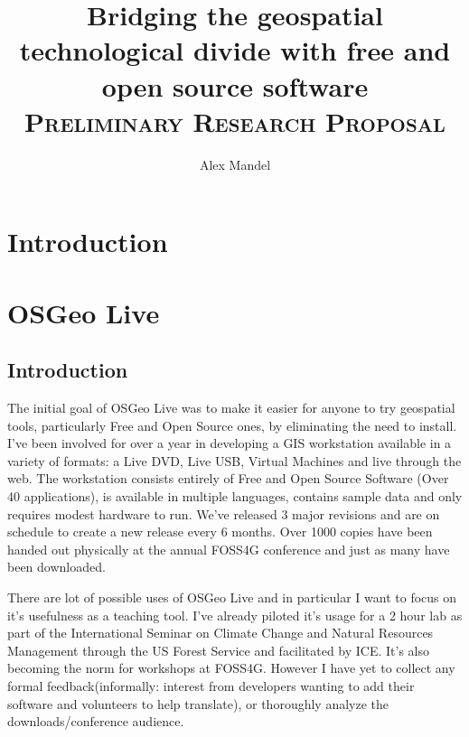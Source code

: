 \documentclass[12pt,letterpaper]{article}
\author{Alex Mandel}
\title{Bridging the geospatial technological divide with free and open source software
\\	
\textsc{\small Preliminary Research Proposal}\\[0.5cm]
}
\begin{document}
\maketitle

\section{Introduction}

\section{OSGeo Live}

\subsection{Introduction}
The initial goal of OSGeo Live was to make it easier for anyone to try geospatial tools, particularly Free and Open Source ones, by eliminating the need to install.
I've been involved for over a year in developing a GIS workstation available in a variety of formats:
a Live DVD, Live USB, Virtual Machines and live through the web. The workstation consists entirely of Free and Open Source Software (Over 40 applications), is available in multiple languages, contains sample data and only requires modest hardware to run. We've released 3 major revisions and are on schedule to create a new release every 6 months. Over 1000 copies have been handed out physically at the annual FOSS4G conference and just as many have been downloaded.

There are lot of possible uses of OSGeo Live and in particular I want to focus on it's usefulness as a teaching tool. I've already piloted it's usage for a 2 hour lab as part of the International Seminar on Climate Change and Natural Resources Management through the US Forest Service and facilitated by ICE. It's also becoming the norm for workshops at FOSS4G. However I have yet to collect any formal feedback(informally: interest from developers wanting to add their software and volunteers to help translate), or thoroughly analyze the downloads/conference audience.
\end{document}
